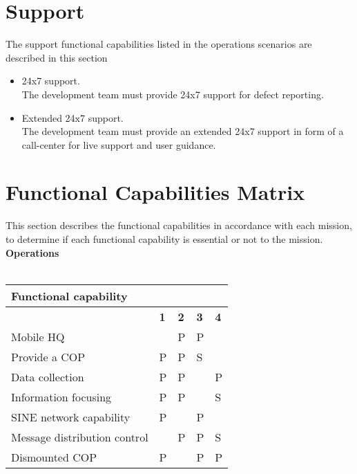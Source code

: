 \section{Support}
The support functional capabilities listed in the operations scenarios are described in this section
\begin{itemize}
	\item 24x7 support.\\
	The development team must provide 24x7 support for defect reporting.
	\item Extended 24x7 support.\\
	The development team must provide an extended 24x7 support in form of a call-center for live support and user guidance.
\end{itemize}


\section{Functional Capabilities Matrix}
This section describes the functional capabilities in accordance with each mission, to determine if each functional capability is essential or not to the mission. \\

\noindent \textbf{Operations}\\\\
\def\arraystretch{1.5}
\noindent\begin{tabular}{|>{}p{4.8cm}|>{\centering\arraybackslash}p{1.5cm}|>{\centering\arraybackslash}p{1.5cm}|>{\centering\arraybackslash}p{1.5cm}|>{\centering\arraybackslash}p{1.5cm}|}
	\hline \textbf{Functional capability} &  \multicolumn{4}{c}{\textbf{Missions}} \vline \\ 
	\hline  							& \textbf{1} & \textbf{2} & \textbf{3} & \textbf{4} \\ 
	\hline Mobile HQ 					&  & P & P &  \\ 
	\hline Provide a COP 				& P & P & S &  \\ 
	\hline Data collection 				& P & P &  & P \\ 
	\hline Information focusing 		& P & P &  & S \\ 
	\hline SINE network capability 		& P &  & P &  \\ 
	\hline Message distribution control &  & P & P & S \\ 
	\hline Dismounted COP 				& P &  & P & P \\ 
	\hline 
\end{tabular}

